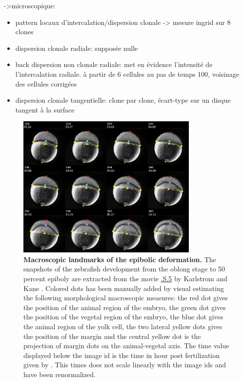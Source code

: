   ->microscopique:  
\begin{itemize}
	\item pattern locaux d'intercalation/dispersion clonale -> mesure ingrid sur 8 clones
	\item dispersion clonale radiale: supposée nulle
	\item back dispersion non clonale radiale: met en évidence l'intensité de l'intercalation radiale. à partir de 6 cellules au pas de temps 100, voisinage des cellules corrigées
	\item dispersion clonale tangentielle: clone par clone, écart-type sur un disque tangent à la surface
\end{itemize}
\begin{figure}
\begin{center}
\includegraphics[width=0.8\textwidth]{../../images/Cases_Studies/Case_4_intercalation/kane_dev/fusion.png}
\end{center}
\caption{\textbf{Macroscopic landmarks of the epibolic deformation.} The snapshots of the zebrafish development from the oblong stage to 50 percent epiboly are extracted from the movie \href{http://public.iscpif.fr/~delile/morphogenesis/manuscript/pragma/figure.html?name=Zebra_Zebrafish_Development_kane}{.S.5} by Karlstrom and Kane \cite{Karlstrom:1996wo}. Colored dots has been manually added by visual estimating the following morphological macroscopic measures: the red dot gives the position of the animal region of the embryo, the green dot gives the position of the vegetal region of the embryo, the blue dot gives the animal region of the yolk cell, the two lateral yellow dots gives the position of the margin and the central yellow dot is the projection of margin dots on the animal-vegetal axis. The time value displayed below the image id is the time in hour post fertilization given by \cite{Karlstrom:1996wo}. This times does not scale linearly with the image ids and have been renormalized.}
\label{kane_dev_fusion}
\end{figure}
